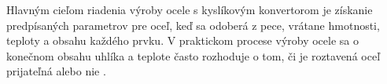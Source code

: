 \documentclass[]{tukediphc}
\begin{document}
%
%
%
%
%
%

Hlavným cieľom riadenia výroby ocele s kyslíkovým konvertorom je získanie predpísaných parametrov pre oceľ, keď sa odoberá z pece, vrátane hmotnosti, teploty a obsahu každého prvku. V praktickom procese výroby ocele sa o konečnom obsahu uhlíka a teplote často rozhoduje o tom, či je roztavená oceľ prijateľná alebo nie \cite{Wang2010}.
\end{document}
